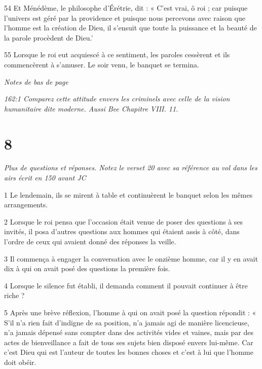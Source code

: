\par 54 Et Ménédème, le philosophe d'Érétrie, dit : « C'est vrai, ô roi ; car puisque l'univers est géré par la providence et puisque nous percevons avec raison que l'homme est la création de Dieu, il s'ensuit que toute la puissance et la beauté de la parole procèdent de Dieu.'

\par 55 Lorsque le roi eut acquiescé à ce sentiment, les paroles cessèrent et ils commencèrent à s'amuser. Le soir venu, le banquet se termina.

\par \textit{Notes de bas de page}

\par \textit{162:1 Comparez cette attitude envers les criminels avec celle de la vision humanitaire dite moderne. Aussi Bee Chapitre VIII. 11.}

\chapter{8}

\par \textit{Plus de questions et réponses. Notez le verset 20 avec sa référence au vol dans les airs écrit en 150 avant JC}

\par 1 Le lendemain, ils se mirent à table et continuèrent le banquet selon les mêmes arrangements.

\par 2 Lorsque le roi pensa que l'occasion était venue de poser des questions à ses invités, il posa d'autres questions aux hommes qui étaient assis à côté, dans l'ordre de ceux qui avaient donné des réponses la veille.

\par 3 Il commença à engager la conversation avec le onzième homme, car il y en avait dix à qui on avait posé des questions la première fois.

\par 4 Lorsque le silence fut établi, il demanda comment il pouvait continuer à être riche ?

\par 5 Après une brève réflexion, l'homme à qui on avait posé la question répondit : « S'il n'a rien fait d'indigne de sa position, n'a jamais agi de manière licencieuse, n'a jamais dépensé sans compter dans des activités vides et vaines, mais par des actes de bienveillance a fait de tous ses sujets bien disposé envers lui-même. Car c'est Dieu qui est l'auteur de toutes les bonnes choses et c'est à lui que l'homme doit obéir.

